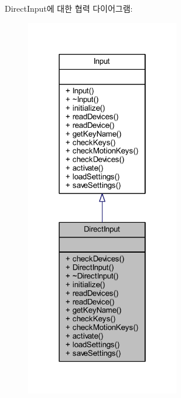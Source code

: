 Direct\+Input에 대한 협력 다이어그램\+:\nopagebreak
\begin{figure}[H]
\begin{center}
\leavevmode
\includegraphics[width=190pt]{class_direct_input__coll__graph}
\end{center}
\end{figure}
